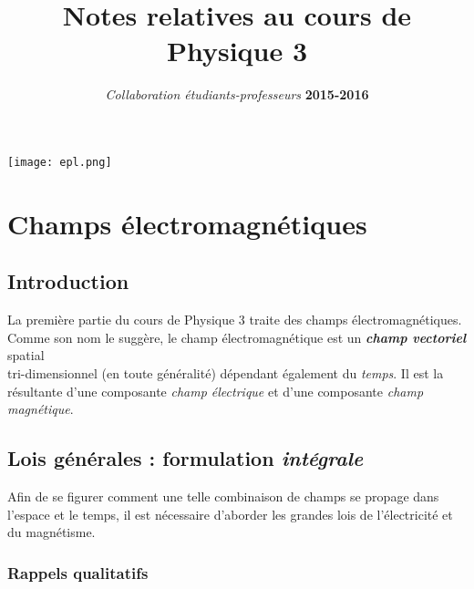 \documentclass[a4paper,12pt]{article}
\begin{document}
\title{Notes relatives au cours de Physique 3}
\author{\textit{Collaboration étudiants-professeurs} \textbf{2015-2016}}
\maketitle

\begin{center}
\texttt{[image: epl.png]}
\end{center}

\tableofcontents

\newpage

\section{Champs électromagnétiques}  %

\subsection{Introduction}

La première partie du cours de Physique 3 traite des champs électromagnétiques. \\
Comme son nom le suggère, le champ électromagnétique est un \textit{\textbf{champ vectoriel}} spatial \\
tri-dimensionnel (en toute généralité) dépendant également du \textit{temps}.  Il est la résultante d'une composante \textit{champ 
électrique} et d'une composante \textit{champ magnétique}. 

\subsection{Lois générales : formulation \textit{intégrale}}

Afin de se figurer comment une telle combinaison de champs se propage dans l'espace et le temps, il est nécessaire d'aborder les grandes 
lois de l'électricité et du magnétisme. 

\subsubsection{Rappels qualitatifs}
\end{document}
